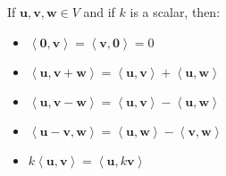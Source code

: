 \documentclass{report}
\begin{document}
			\begin{defn}
				If $\bm{u}, \bm{v}, \bm{w} \in V$ and if $k$ is a scalar, then:
				\begin{itemize}
					\item $\left< \bm{0} , \bm{v} \right>=\left< \bm{v} , \bm{0} \right>=0$
					\item $\left< \bm{u} , \bm{v}+\bm{w} \right>=\left< \bm{u} , \bm{v} \right>+\left< \bm{u} , \bm{w} \right>$
					\item $\left< \bm{u} , \bm{v}-\bm{w} \right>=\left< \bm{u} , \bm{v} \right>-\left< \bm{u} , \bm{w} \right>$
					\item $\left< \bm{u}-\bm{v} , \bm{w} \right>=\left< \bm{u} , \bm{w} \right>-\left< \bm{v} , \bm{w} \right>$
					\item $k\left< \bm{u} , \bm{v} \right>=\left< \bm{u} , k\bm{v} \right>$
				\end{itemize}
			\end{defn}
		
\end{document}
